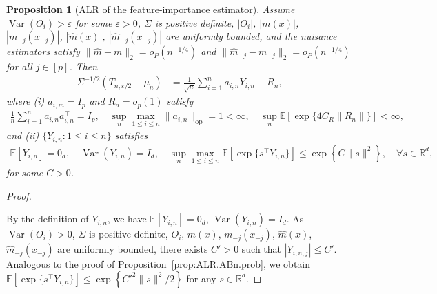 \documentclass[12pt]{article}
\newcommand{\op}{\mathrm{op}}
\newtheorem{proposition}{Proposition}[section]
\newcommand{\Var}{\operatorname{Var}}
\newcommand{\real}{\mathbb{R}}
\newcommand{\Ee}{{\mathbb{E}}}
\newcommand{\zg}[1]{{\color{cyan}#1}}
\begin{document}
\begin{appendices}
\begin{proposition}[ALR of the feature-importance estimator]
\label{prop:VIM_normal}
Assume $\Var(O_i) > \varepsilon$ for some $\varepsilon > 0$, $\Sigma$ is positive definite, $|O_i|$, $|m(x)|$, $|m_{-j}(x_{-j})|$, $|\widehat{m}(x)|$, $|\widehat{m}_{-j}(x_{-j})|$ are uniformly bounded,
and the nuisance estimators satisfy $\|\widehat m - m\|_2 = o_P(n^{-1/4})$ and $\|\widehat m_{-j} - m_{-j}\|_2 = o_P(n^{-1/4})$ for all $j \in [p]$. Then
\begin{align}
\Sigma^{-1/2}(T_{n,\varepsilon/2}-\mu_n)
&=
\frac{1}{\sqrt{n}}\sum_{i=1}^n a_{i,n} Y_{i,n}
+ R_n,
\label{eq:VIM_ALR}
\end{align}
where (i) $a_{i,m}=I_p$ and $R_n=o_p(1)$ satisfy
\begin{align*}
  \frac{1}{n}\sum_{i=1}^n a_{i,n}a_{i,n}^{\top}=I_p,
  \quad
  \sup_{n}\max_{1\le i\le n}\|a_{i,n}\|_{\op} = 1 < \infty,
  \quad
  \sup_n\Ee\left[\exp\{4C_R\|R_n\|\}\right] <\infty,
\end{align*}
and (ii) $\{Y_{i,n}:1\le i\le n\}$ satisfies
\begin{align*}
  \Ee[Y_{i,n}]=0_d,
  \quad
  \Var(Y_{i,n})=I_d,
  \quad
  \sup_{n}\max_{1\le i\le n}
  \Ee[\exp\{s^\top Y_{i,n}\}]
  \le
  \exp\left\{C\|s\|^2\right\},
  \quad
  \forall s\in\real^d,
\end{align*}
for some $C > 0$.
\end{proposition}


\begin{proof}\label{proof:prop:VIM_normal}

By the definition of $Y_{i,n}$, we have $ \Ee[Y_{i,n}]=0_d$, $\Var(Y_{i,n})=I_d$. 
As $\Var(O_i) > 0$, $\Sigma$ is positive definite, $O_i$, $m(x)$, $m_{-j}(x_{-j})$, $\widehat{m}(x)$, $\widehat{m}_{-j}(x_{-j})$ are uniformly bounded, there exists $C' > 0$ such that $|Y_{i,n,j}| \le C'$.
Analogous to the proof of Proposition~\ref{prop:ALR.ABn.prob}, we obtain $\Ee[\exp\{s^\top Y_{i,n}\}] \le \exp\left\{{C'}^2\|s\|^2/2\right\}$ for any $s\in\real^d$.



\end{proof}
\end{appendices}
\end{document}
